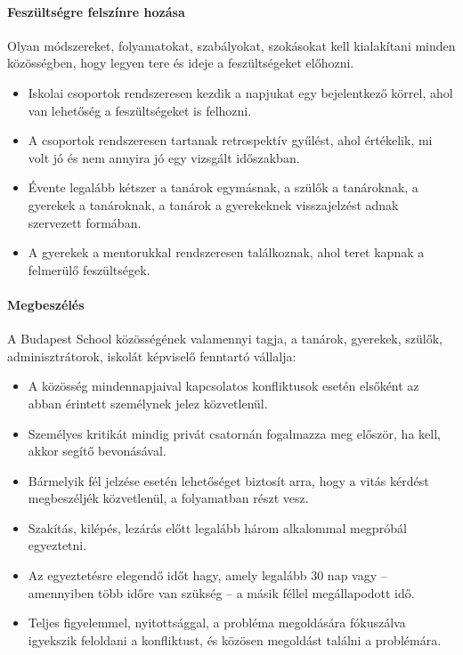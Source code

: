 \paragraph{Feszültségre felszínre hozása}
Olyan módszereket, folyamatokat, szabályokat, szokásokat kell kialakítani
minden közösségben, hogy legyen tere és ideje a feszültségeket előhozni.
\begin{itemize}
    \item Iskolai csoportok rendszeresen kezdik a napjukat egy bejelentkező
          körrel, ahol van lehetőség a feszültségeket is felhozni.
    \item A csoportok rendszeresen tartanak retrospektív gyűlést, ahol
          értékelik, mi volt jó és nem annyira jó egy vizsgált időszakban.
    \item Évente legalább kétszer a tanárok egymásnak, a szülők a tanároknak, a
          gyerekek a tanároknak, a tanárok a gyerekeknek visszajelzést adnak
          szervezett
          formában.
    \item A gyerekek a mentorukkal rendszeresen találkoznak, ahol teret kapnak
          a felmerülő feszültségek.
\end{itemize}

\paragraph{Megbeszélés}

A Budapest School közösségének valamennyi tagja, a tanárok, gyerekek,
szülők, adminisztrátorok, iskolát képviselő fenntartó vállalja:

\begin{itemize}

    \item
          A közösség mindennapjaival kapcsolatos konfliktusok esetén elsőként
          az
          abban érintett személynek jelez közvetlenül.
    \item
          Személyes kritikát mindig privát csatornán fogalmazza meg először, ha
          kell, akkor segítő bevonásával.
    \item
          Bármelyik fél jelzése esetén lehetőséget biztosít
          arra, hogy a vitás kérdést megbeszéljék közvetlenül, a folyamatban
          részt vesz.
    \item
          Szakítás, kilépés, lezárás előtt legalább három alkalommal megpróbál
          egyeztetni.
    \item
          Az egyeztetésre elegendő időt hagy, amely legalább 30 nap vagy --
          amennyiben több időre van szükség -- a másik féllel megállapodott
          idő.
    \item
          Teljes figyelemmel, nyitottsággal, a probléma megoldására fókuszálva
          igyekszik feloldani a konfliktust, és közösen megoldást találni a
          problémára.
\end{itemize}

